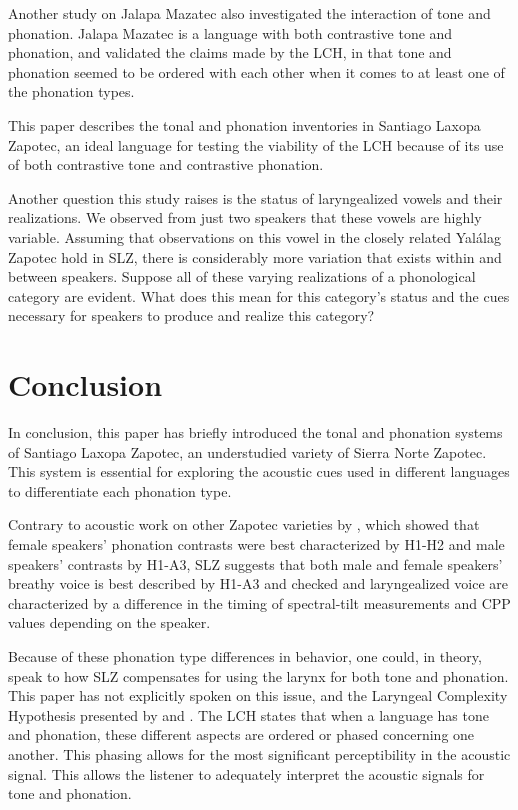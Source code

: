 \documentclass[12pt, letterpaper]{article}
\begin{document}
Another study on Jalapa Mazatec \citep{garellekAcousticConsequencesPhonation2011} also investigated the interaction of tone and phonation. Jalapa Mazatec is a language with both contrastive tone and phonation, and \citet{garellekAcousticConsequencesPhonation2011} validated the claims made by the LCH, in that tone and phonation seemed to be ordered with each other when it comes to at least one of the phonation types. 

This paper describes the tonal and phonation inventories in Santiago Laxopa Zapotec, an ideal language for testing the viability of the LCH because of its use of both contrastive tone and contrastive phonation.   

Another question this study raises is the status of laryngealized vowels and their realizations. We observed from just two speakers that these vowels are highly variable. Assuming that  observations on this vowel in the closely related Yalálag Zapotec hold in SLZ, there is considerably more variation that exists within and between speakers. Suppose all of these varying realizations of a phonological category are evident. What does this mean for this category's status and the cues necessary for speakers to produce and realize this category? 

\section{Conclusion} \label{sec:Conclusion}

In conclusion, this paper has briefly introduced the tonal and phonation systems of Santiago Laxopa Zapotec, an understudied variety of Sierra Norte Zapotec. This system is essential for exploring the acoustic cues used in different languages to differentiate each phonation type.

Contrary to acoustic work on other Zapotec varieties by \citet{espositoVariationContrastivePhonation2010}, which showed that female speakers' phonation contrasts were best characterized by H1-H2 and male speakers' contrasts by H1-A3, SLZ suggests that both male and female speakers' breathy voice is best described by H1-A3 and checked and laryngealized voice are characterized by a difference in the timing of spectral-tilt measurements and CPP values depending on the speaker. 

Because of these phonation type differences in behavior, one could, in theory, speak to how SLZ compensates for using the larynx for both tone and phonation. This paper has not explicitly spoken on this issue, and the Laryngeal Complexity Hypothesis presented by \citet{silvermanLaryngealComplexityOtomanguean1997} and \citet{blankenshipTimeCourseBreathiness1997, blankenshipTimingNonmodalPhonation2002}. The LCH states that when a language has tone and phonation, these different aspects are ordered or phased concerning one another. This phasing allows for the most significant perceptibility in the acoustic signal. This allows the listener to adequately interpret the acoustic signals for tone and phonation. 
\end{document}
